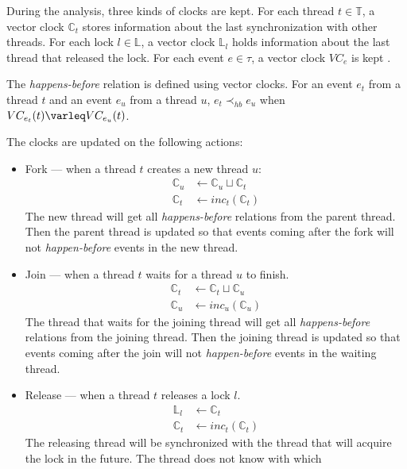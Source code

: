 During the analysis, three kinds of clocks are kept. For each thread $t \in
\mathbb{T}$, a vector clock $\mathbb{C}_t$ stores information about the last
synchronization with other threads. For each lock $l \in \mathbb{L}$, a vector
clock $\mathbb{L}_l$ holds information about the last thread that released the
lock. For each event $e \in \tau$, a vector clock $VC_e$ is kept
\cite{contracts}.

The \emph{happens-before} relation is defined using vector clocks. For an event
$e_t$ from a thread $t$ and an event $e_u$ from a thread $u$, $e_t \prec_{hb}
e_u$ when $VC_{e_t}(t) \varleq VC_{e_u}(t)$.

The clocks are updated on the following actions:
\begin{itemize}
    \item Fork --- when a thread $t$ creates a new thread $u$:
        \begin{align*}
            \mathbb{C}_u &\leftarrow \mathbb{C}_u \sqcup \mathbb{C}_t \\
            \mathbb{C}_t &\leftarrow inc_t(\mathbb{C}_t)
        \end{align*}
        The new thread will get all \emph{happens-before} relations from the
        parent thread. Then the parent thread is updated so that events coming
        after the fork will not \emph{happen-before} events in the new thread.
    \item Join --- when a thread $t$ waits for a thread $u$ to finish.
        \begin{align*}
            \mathbb{C}_t &\leftarrow \mathbb{C}_t \sqcup \mathbb{C}_u \\
            \mathbb{C}_u &\leftarrow inc_u(\mathbb{C}_u)
        \end{align*}
        The thread that waits for the joining thread will get all
        \emph{happens-before} relations from the joining thread. Then the
        joining thread is updated so that events coming after the join will not
        \emph{happen-before} events in the waiting thread.
    \item Release --- when a thread $t$ releases a lock $l$.
        \begin{align*}
            \mathbb{L}_l &\leftarrow \mathbb{C}_t \\
            \mathbb{C}_t &\leftarrow inc_t(\mathbb{C}_t)
        \end{align*}
        The releasing thread will be synchronized with the thread that will
        acquire the lock in the future. The thread does not know with which

\end{itemize}
